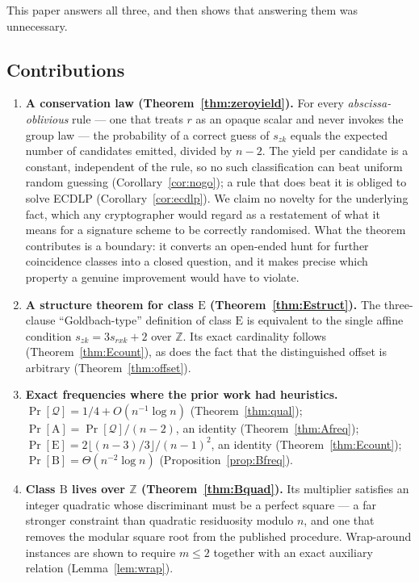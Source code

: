 \documentclass[11pt,a4paper]{article}
\theoremstyle{plain}
\theoremstyle{definition}
\theoremstyle{remark}
\newcommand{\Zz}{\mathbb{Z}}
\newcommand{\Qu}{\mathcal{Q}}
\newcommand{\Pro}{\Pr}
\newcommand{\szk}{s_{zk}}
\newcommand{\srxk}{s_{rxk}}
\newcommand{\clA}{\mathrm{A}}
\newcommand{\clB}{\mathrm{B}}
\newcommand{\clE}{\mathrm{E}}
\begin{document}
This paper answers all three, and then shows that answering them was unnecessary.

\subsection{Contributions}

\begin{enumerate}[leftmargin=*,itemsep=3pt]
\item \textbf{A conservation law (Theorem~\ref{thm:zeroyield}).} For every
  \emph{abscissa-oblivious} rule --- one that treats $r$ as an opaque scalar and never invokes the
  group law --- the probability of a correct guess of $\szk$ equals the expected number of
  candidates emitted, divided by $n-2$. The yield per candidate is a constant, independent of the
  rule, so no such classification can beat uniform random guessing
  (Corollary~\ref{cor:nogo}); a rule that does beat it is obliged to solve ECDLP
  (Corollary~\ref{cor:ecdlp}). We claim no novelty for the underlying fact, which any
  cryptographer would regard as a restatement of what it means for a signature scheme to be
  correctly randomised. What the theorem contributes is a boundary: it converts an open-ended
  hunt for further coincidence classes into a closed question, and it makes precise which
  property a genuine improvement would have to violate.

\item \textbf{A structure theorem for class $\clE$ (Theorem~\ref{thm:Estruct}).} The three-clause
  ``Goldbach-type'' definition of class $\clE$ is equivalent to the single affine condition
  $\szk = 3\srxk + 2$ over $\Zz$. Its exact cardinality follows
  (Theorem~\ref{thm:Ecount}), as does the fact that the distinguished offset is arbitrary
  (Theorem~\ref{thm:offset}).

\item \textbf{Exact frequencies where the prior work had heuristics.} $\Pro[\Qu] = 1/4 +
  O(n^{-1}\log n)$ (Theorem~\ref{thm:qual}); $\Pro[\clA] = \Pro[\Qu]/(n-2)$, an identity
  (Theorem~\ref{thm:Afreq}); $\Pro[\clE] = 2\lfloor (n-3)/3\rfloor/(n-1)^{2}$, an identity
  (Theorem~\ref{thm:Ecount}); $\Pro[\clB] = \Theta(n^{-2}\log n)$
  (Proposition~\ref{prop:Bfreq}).

\item \textbf{Class $\clB$ lives over $\Zz$ (Theorem~\ref{thm:Bquad}).} Its multiplier satisfies
  an integer quadratic whose discriminant must be a perfect square --- a far stronger constraint
  than quadratic residuosity modulo $n$, and one that removes the modular square root from the
  published procedure. Wrap-around instances are shown to require $m \le 2$ together with an exact
  auxiliary relation (Lemma~\ref{lem:wrap}).


\end{enumerate}
\end{document}
